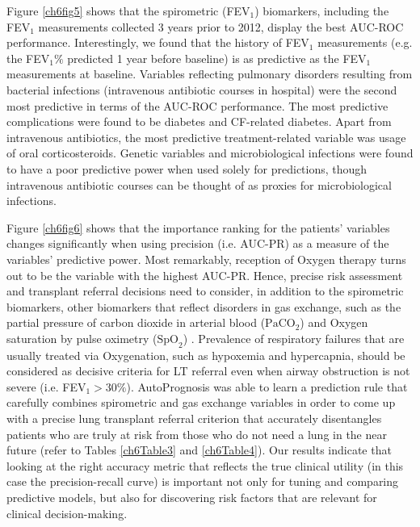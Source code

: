 \documentclass [PhD] {uclathes}
\begin{document}
Figure \ref{ch6fig5} shows that the spirometric (FEV$_1$) biomarkers, including the FEV$_1$ measurements collected 3 years prior to 2012, display the best AUC-ROC performance. Interestingly, we found that the history of FEV$_1$ measurements (e.g. the FEV$_1\%$ predicted 1 year before baseline) is as predictive as the FEV$_1$ measurements at baseline. Variables reflecting pulmonary disorders resulting from bacterial infections (intravenous antibiotic courses in hospital\cite{ewence2017302}) were the second most predictive in terms of the AUC-ROC performance. The most predictive complications were found to be diabetes and CF-related diabetes. Apart from intravenous antibiotics, the most predictive treatment-related variable was usage of oral corticosteroids. Genetic variables and microbiological infections were found to have a poor predictive power when used solely for predictions, though intravenous antibiotic courses can be thought of as proxies for microbiological infections.  

Figure \ref{ch6fig6} shows that the importance ranking for the patients' variables changes significantly when using precision (i.e. AUC-PR) as a measure of the variables' predictive power. Most remarkably, reception of Oxygen therapy turns out to be the variable with the highest AUC-PR. Hence, precise risk assessment and transplant referral decisions need to consider, in addition to the spirometric biomarkers, other biomarkers that reflect disorders in gas exchange, such as the partial pressure of carbon dioxide in arterial blood ($\mbox{PaCO}_2$) and Oxygen saturation by pulse oximetry ($\mbox{SpO}_2$) \cite{sheikh2011severe}. Prevalence of respiratory failures that are usually treated via Oxygenation, such as hypoxemia and hypercapnia\cite{sheikh2011severe,hetero,young2011gas,wojewodka2014candidate}, should be considered as decisive criteria for LT referral even when airway obstruction is not severe (i.e. FEV$_1>$30$\%$). AutoPrognosis was able to learn a prediction rule that carefully combines spirometric and gas exchange variables in order to come up with a precise lung transplant referral criterion that accurately disentangles patients who are truly at risk from those who do not need a lung in the near future (refer to Tables \ref{ch6Table3} and \ref{ch6Table4}). Our results indicate that looking at the right accuracy metric that reflects the true clinical utility (in this case the precision-recall curve) is important not only for tuning and comparing predictive models, but also for discovering risk factors that are relevant for clinical decision-making.          
\end{document}
